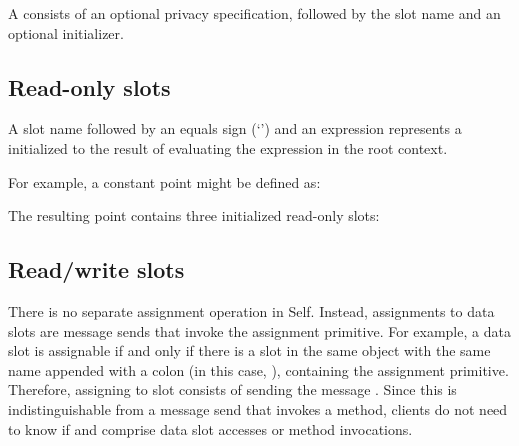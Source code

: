 \documentclass[letterpaper,10pt,english]{sphinxmanual}
\begin{document}
A  consists of an optional privacy specification, followed by the slot name and an optional initializer.


\subsection{Read-only slots}
\label{\detokenize{langref:read-only-slots}}
A slot name followed by an equals sign (‘\sphinxcode{=}’) and an expression represents a  initialized to the result of evaluating the expression in the root context.

For example, a constant point might be defined as:

\begin{sphinxVerbatim}[commandchars=\\\{\}]
       
          
        
 
\end{sphinxVerbatim}

The resulting point contains three initialized read-only slots:
\begin{figure}[htbp]
\centering

\noindent{}
\end{figure}


\subsection{Read/write slots}
\label{\detokenize{langref:pp-read-write-slots}}\label{\detokenize{langref:read-write-slots}}\label{\detokenize{langref:index-37}}
There is no separate assignment operation in Self. Instead, assignments to data slots are message sends that invoke the assignment primitive. For example, a data slot  is assignable if and only if there is a slot in the same object with the same name appended with a colon (in this case, ), containing the assignment primitive. Therefore, assigning  to slot  consists of sending the message . Since this is indistinguishable from a message send that invokes a method, clients do not need to know if  and  comprise data slot accesses or method invocations.
\end{document}
